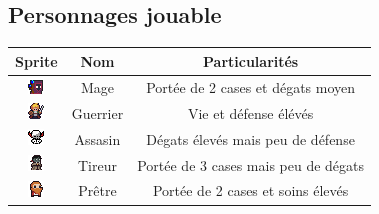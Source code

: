 \documentclass[a4paper, 12pt]{article}
\begin{document}
\subsection*{Personnages jouable}
\begin{center}
\begin{tabular}{ | c | c | c | }
	\hline
    Sprite & Nom & Particularités\\
    \hline
    
    \includegraphics[scale=2.2]{./players/Magus} & Mage & Portée de 2 cases et dégats moyen\\
    \hline
    
    \includegraphics[scale=1.9]{./players/WarriorNew} & Guerrier & Vie et défense élévés\\
    \hline
    
    \includegraphics[scale=2.2]{./players/Rogue} & Assasin & Dégats élevés mais peu de défense\\
    \hline
    
    \includegraphics[scale=2.2]{./players/Ranger} & Tireur & Portée de 3 cases mais peu de dégats\\
    \hline
    
    \includegraphics[scale=1.9]{./players/Healer} & Prêtre & Portée de 2 cases et soins élevés\\
	\hline
\end{tabular}
\end{center}
\end{document}
